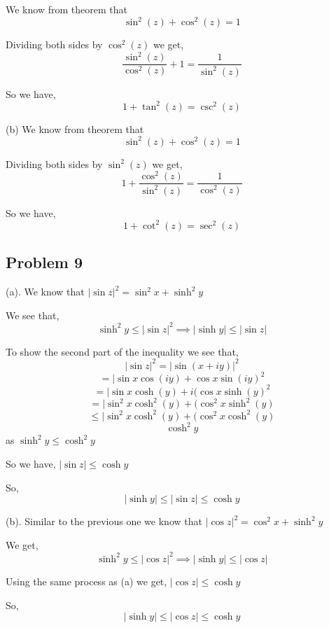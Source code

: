 \documentclass[a4paper]{report}
\begin{document}
We know from theorem that $$\sin^2(z) + \cos^2(z) = 1$$

Dividing both sides by $\cos^2(z)$ we get, 
$$ \frac{\sin^2(z)}{\cos^2(z)} + 1 = \frac{1}{\sin^2(z)} $$ 

So we have, 
$$ 1 + \tan^2(z) = \csc^2(z) $$ 

(b)
We know from theorem that $$\sin^2(z) + \cos^2(z) = 1$$

Dividing both sides by $\sin^2(z)$ we get, 
$$ 1 + \frac{\cos^2(z)}{\sin^2(z)} = \frac{1}{\cos^2(z)} $$ 

So we have, 
$$ 1 + \cot^2(z) = \sec^2(z) $$ 


\subsection*{Problem 9}

(a). We know that $|\sin z|^2 = \sin^2 x + \sinh^2 y$

We see that, 
$$ \sinh^2 y \le |\sin z|^2 \implies |\sinh y| \le |\sin z|$$ 


To show the second part of the inequality we see that, 
$$ |\sin z|^2  = |\sin(x + iy)|^2$$
$$ =|\sin x \cos(iy) + \cos x \sin(iy) ^2$$ 
$$ =|\sin x \cosh(y) + i(\cos x \sinh(y) ^2$$ 
$$ =|\sin^2 x \cosh^2(y) + (\cos^2 x \sinh^2(y) $$ 
$$ \le|\sin^2 x \cosh^2(y) + (\cos^2 x \cosh^2(y) $$ 
$$ \cosh^2 y$$
as $\sinh^2 y \le \cosh^2 y$

So we have, $|\sin z | \le \cosh y$

So, 
$$ |\sinh y| \le |\sin z| \le \cosh y $$ 

(b). Similar to the previous one we know that $|\cos z|^2 = \cos^2 x + \sinh^2 y$

We get, 
$$ \sinh^2 y \le |\cos z|^2 \implies |\sinh y| \le |\cos z| $$


Using the same process as (a) we get, $|\cos z | \le \cosh y$

So,  
$$ |\sinh y| \le |\cos z| \le \cosh y $$ 
\end{document}

